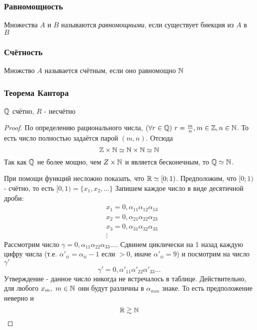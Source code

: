 \subsubsection*{Равномощность}

\begin{definition}
    Множества $A$ и $B$ называются \textit{равномощными}, если существует биекция из $A$ в $B$
\end{definition}

\subsubsection*{Счётность}

\begin{definition}
    Множство $A$ называется счётным, если оно равномощно $\mathbb{N}$
\end{definition}

\subsubsection*{Теорема Кантора}

\begin{proposition}
    $\mathbb{Q}$ счётно, $R$ - несчётно
\end{proposition}

\begin{proof}
    По определению рационального числа, $(\forall r \in \mathbb{Q})\ r = \frac{m}{n}, m \in \mathbb{Z}, n \in \mathbb{N}$. То есть число полностью задаётся парой $(m, n)$. Отсюда
    \[
    	\mathbb{Z} \times \mathbb{N} \simeq \mathbb{N} \times \mathbb{N} \simeq \mathbb{N}
    \]
    Так как $\mathbb{Q}$ не более мощно, чем $Z \times \mathbb{N}$ и является бесконечным, то $\mathbb{Q} \simeq \mathbb{N}$.
    
    При помощи функций несложно показать, что $\mathbb{R} \simeq [0; 1)$. Предположим, что $[0; 1)$ - счётно, то есть $[0, 1) = \{x_1, x_2, \dots\}$
    Запишем каждое число в виде десятичной дроби:
    \begin{align*}
		&{x_1 = 0, \alpha_{11} \alpha_{12} \alpha_{13}}
        \\
        &{x_2 = 0, \alpha_{21} \alpha_{22} \alpha_{23}}
        \\
        &{x_3 = 0, \alpha_{31} \alpha_{32} \alpha_{33}}
        \\
        &\vdots
    \end{align*}
    Рассмотрим число $\gamma = 0,\alpha_{11}\alpha_{22}\alpha_{33}\dots$. Сдвинем циклически на 1 назад каждую цифру числа (т.е. $\alpha'_{ii} = \alpha_{ii} - 1$ если $> 0$, иначе $\alpha'_{ii} = 9$) и посмотрим на число $\gamma'$
    \[
    	\gamma' = 0,\alpha'_{11}\alpha'_{22}\alpha'_{33}\dots
    \]
    Утверждение - данное число никогда не встречалось в таблице. Действительно, для любого $x_m,\ m \in \mathbb{N}$ они будут различны в $\alpha_{mm}$ знаке. То есть предположение неверно и
    \[
    	\mathbb{R} \gtrsim \mathbb{N}
    \]
\end{proof}

